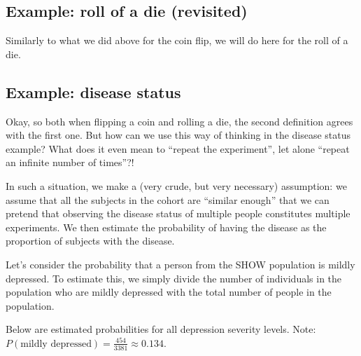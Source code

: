 \documentclass[]{book}
\theoremstyle{definition}
\theoremstyle{definition}
\theoremstyle{definition}
\theoremstyle{remark}
\begin{document}
\hypertarget{example-roll-of-a-die-revisited}{%
\subsection{Example: roll of a die (revisited)}\label{example-roll-of-a-die-revisited}}

Similarly to what we did above for the coin flip, we will do here for the roll of a die.

\hypertarget{example-disease-status-1}{%
\subsection{Example: disease status}\label{example-disease-status-1}}

Okay, so both when flipping a coin and rolling a die, the second definition agrees with the first one. But how can we use this way of thinking in the disease status example? What does it even mean to ``repeat the experiment'', let alone ``repeat an infinite number of times''?!

In such a situation, we make a (very crude, but very necessary) assumption: we assume that all the subjects in the cohort are ``similar enough'' that we can pretend that observing the disease status of multiple people constitutes multiple experiments. We then estimate the probability of having the disease as the proportion of subjects with the disease.

Let's consider the probability that a person from the SHOW population is mildly depressed. To estimate this, we simply divide the number of individuals in the population who are mildly depressed with the total number of people in the population.

Below are estimated probabilities for all depression severity levels. Note: \(P(\text{mildly depressed}) = \frac{454}{3381} \approx 0.134\).
\end{document}
